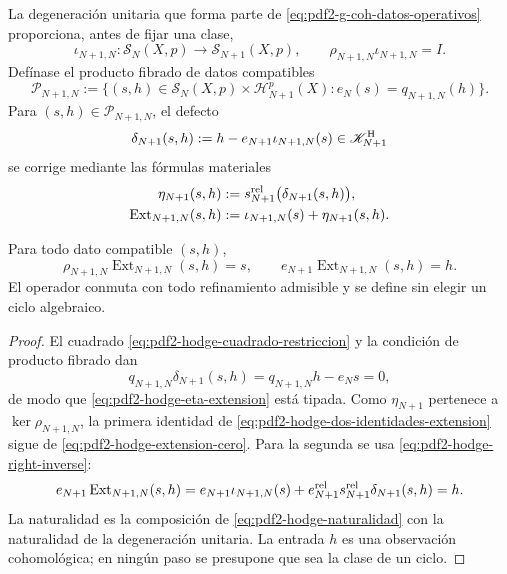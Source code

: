 La degeneración unitaria que forma parte de
\eqref{eq:pdf2-g-coh-datos-operativos} proporciona, antes de fijar una clase,
\begin{equation}\label{eq:pdf2-hodge-extension-cero}
 \iota_{N+1,N}:\mathscr S_N(X,p)\longrightarrow\mathscr S_{N+1}(X,p),
 \qquad \rho_{N+1,N}\iota_{N+1,N}=I.
\end{equation}
Defínase el producto fibrado de datos compatibles
\begin{equation}\label{eq:pdf2-hodge-pullback-extension}
 \mathscr P_{N+1,N}:=
 \{(s,h)\in\mathscr S_N(X,p)\times\mathscr H_{N+1}^p(X):
             e_N(s)=q_{N+1,N}(h)\}.
\end{equation}
Para $(s,h)\in\mathscr P_{N+1,N}$, el defecto
\begin{equation}\label{eq:pdf2-hodge-defecto-universal}
 \delta_{N+1}(s,h):=
 h-e_{N+1}\iota_{N+1,N}(s)
 \in\mathscr K^{\rm H}_{N+1}
\end{equation}
se corrige mediante las fórmulas materiales
\begin{equation}\label{eq:pdf2-hodge-eta-extension}
 \begin{aligned}
  \eta_{N+1}(s,h)&:=
     s_{N+1}^{\rm rel}\bigl(\delta_{N+1}(s,h)\bigr),\\
  \operatorname{Ext}_{N+1,N}(s,h)&:=
     \iota_{N+1,N}(s)+\eta_{N+1}(s,h).
 \end{aligned}
\end{equation}

\begin{theorem}
\label{thm:pdf2-hodge-extension-universal}
Para todo dato compatible $(s,h)$,
\begin{equation}\label{eq:pdf2-hodge-dos-identidades-extension}
 \rho_{N+1,N}\operatorname{Ext}_{N+1,N}(s,h)=s,
 \qquad
 e_{N+1}\operatorname{Ext}_{N+1,N}(s,h)=h.
\end{equation}
El operador conmuta con todo refinamiento admisible y se define sin elegir
un ciclo algebraico.
\end{theorem}

\begin{proof}
El cuadrado \eqref{eq:pdf2-hodge-cuadrado-restriccion} y la condición de
producto fibrado dan
\[
 q_{N+1,N}\delta_{N+1}(s,h)
 =q_{N+1,N}h-e_Ns=0,
\]
de modo que \eqref{eq:pdf2-hodge-eta-extension} está tipada. Como
$\eta_{N+1}$ pertenece a $\ker\rho_{N+1,N}$, la primera identidad de
\eqref{eq:pdf2-hodge-dos-identidades-extension} sigue de
\eqref{eq:pdf2-hodge-extension-cero}. Para la segunda se usa
\eqref{eq:pdf2-hodge-right-inverse}:
\[
 e_{N+1}\operatorname{Ext}_{N+1,N}(s,h)
 =e_{N+1}\iota_{N+1,N}(s)
  +e_{N+1}^{\rm rel}s_{N+1}^{\rm rel}\delta_{N+1}(s,h)=h.
\]
La naturalidad es la composición de
\eqref{eq:pdf2-hodge-naturalidad} con la naturalidad de la degeneración
unitaria. La entrada $h$ es una observación cohomológica; en ningún paso
se presupone que sea la clase de un ciclo.
\end{proof}

